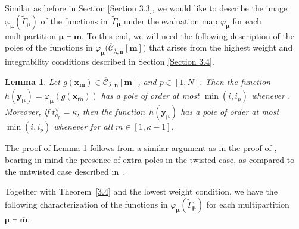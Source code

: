 \documentclass[pdftex]{sigma}
\numberwithin{equation}{section}
\newtheorem{Lemma}[Theorem]{Lemma}
\begin{document}
Similar as before in Section \ref{Section 3.3}, we would like to describe the image $\varphi_{\bm{\mu}}(\tilde{\Gamma}_{ \bm{\mu}})$ of the functions in~$\tilde{\Gamma}_{\bm{\mu}}$ under the evaluation map $\varphi_{\bm{\mu}}$ for each multipartition $\bm{\mu}\vdash\overline{\mathbf{m}}$. To this end, we will need the following description of the poles of the functions in $\varphi_{\bm{\mu}}\bigl(\overline{\mathcal{C}}_{ \overline{\lambda},\mathbf{n}}[\overline{\mathbf{m}}]\bigr)$ that arises from the highest weight and integrability conditions described in Section \ref{Section 3.4}.

\begin{Lemma}\label{3.8}
Let $g(\mathbf{x}_{\overline{\mathbf{m}}})\in \overline{ \mathcal{C}}_{\overline{\lambda},\mathbf{n}}[\overline{ \mathbf{m}}]$, and $p\in[1,N]$. Then the function $h(\mathbf{y}_{\bm{\mu}})=\varphi_{\bm{\mu}}(g(\mathbf{x}_{ \overline{ \mathbf{m}}}))$ has a pole of order at most $\min(i,i_p)$ whenever . Moreover, if $t_{a_p}^{\vee}=\kappa$, then the function~$h(\mathbf{y}_{\bm{ \mu}})$ has a pole of order at most $\min(i,i_p)$ whenever  for all $m\in[1,\kappa-1]$.
\end{Lemma}

The proof of Lemma \ref{3.8} follows from a similar argument as in the proof of \cite[Lemma 3.9]{AKS06}, bearing in mind the presence of extra poles in the twisted case, as compared to the untwisted case described in~\cite{AK07,AKS06}.

Together with Theorem~\ref{3.4} and the lowest weight condition, we have the following characterization of the functions in $\varphi_{\bm{\mu}}(\tilde{\Gamma}_{\bm{\mu}})$ for each multipartition $\bm{\mu}\vdash\overline{\mathbf{m}}$.
\end{document}

